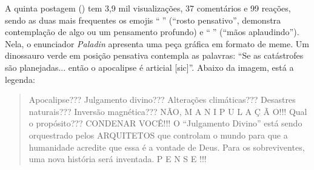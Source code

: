 \documentclass[portuguese]{textolivre}
\begin{document}
A quinta postagem () tem 3,9 mil visualizações, 37 comentários e 99 reações, sendo as duas mais frequentes os emojis ``{\Symbola 🤔}'' (``rosto pensativo'', demonstra contemplação de algo ou um pensamento profundo) e ``{\Symbola 👏}'' (``mãos aplaudindo''). Nela, o enunciador \emph{Paladin} apresenta uma peça gráfica em formato de meme. Um dinossauro verde em posição pensativa contempla as palavras: ``Se as catástrofes são planejadas... então o apocalipse é articial [sic]''. Abaixo da imagem, está a legenda: 

\begin{quote}
Apocalipse??? Julgamento divino??? Alterações climáticas??? Desastres naturais??? Inversão magnética??? NÃO, M A N I P U L A Ç Ã O!!! Qual o propósito??? CONDENAR VOCÊ!!! O ``Julgamento Divino'' está sendo orquestrado pelos ARQUITETOS que controlam o mundo para que a humanidade acredite que essa é a vontade de Deus. Para os sobreviventes, uma nova história será inventada. P E N S E !!! {\Symbola 🤔}
\end{quote}
\end{document}

